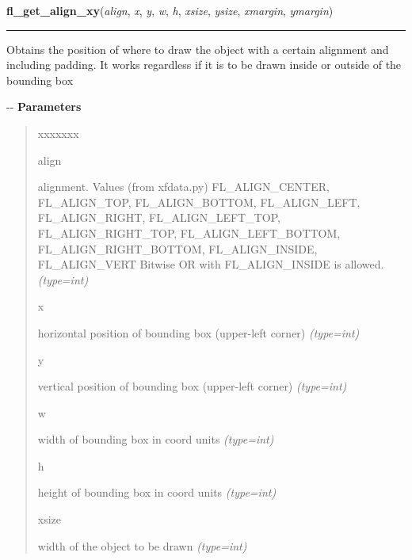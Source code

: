 \hspace{.8\funcindent}\begin{boxedminipage}{\funcwidth}

    \raggedright \textbf{fl\_get\_align\_xy}(\textit{align}, \textit{x}, \textit{y}, \textit{w}, \textit{h}, \textit{xsize}, \textit{ysize}, \textit{xmargin}, \textit{ymargin})

    \vspace{-1.5ex}

    \rule{\textwidth}{0.5\fboxrule}
\setlength{\parskip}{2ex}

Obtains the position of where to draw the object with a certain
alignment and including padding. It works regardless if it is to be drawn
inside or outside of the bounding box

-{}-
\setlength{\parskip}{1ex}
      \textbf{Parameters}
      \vspace{-1ex}

      \begin{quote}
        \begin{Ventry}{xxxxxxx}

          \item[align]


alignment. Values (from xfdata.py) FL\_ALIGN\_CENTER, FL\_ALIGN\_TOP,
FL\_ALIGN\_BOTTOM, FL\_ALIGN\_LEFT, FL\_ALIGN\_RIGHT, FL\_ALIGN\_LEFT\_TOP,
FL\_ALIGN\_RIGHT\_TOP, FL\_ALIGN\_LEFT\_BOTTOM, FL\_ALIGN\_RIGHT\_BOTTOM,
FL\_ALIGN\_INSIDE, FL\_ALIGN\_VERT
Bitwise OR with FL\_ALIGN\_INSIDE is allowed.
            {\it (type=int)}

          \item[x]


horizontal position of bounding box (upper-left corner)
            {\it (type=int)}

          \item[y]


vertical position of bounding box (upper-left corner)
            {\it (type=int)}

          \item[w]


width of bounding box in coord units
            {\it (type=int)}

          \item[h]


height of bounding box in coord units
            {\it (type=int)}

          \item[xsize]


width of the object to be drawn
            {\it (type=int)}


\end{Ventry}
\end{quote}
\end{boxedminipage}
